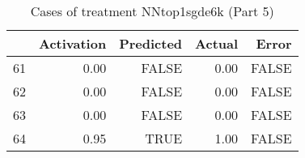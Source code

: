 \begin{table}[ht]
\centering
\begin{tabular}{rrrrr}
  \hline
 & Activation & Predicted & Actual & Error \\ 
  \hline
61 & 0.00 & FALSE & 0.00 & FALSE \\ 
  62 & 0.00 & FALSE & 0.00 & FALSE \\ 
  63 & 0.00 & FALSE & 0.00 & FALSE \\ 
  64 & 0.95 & TRUE & 1.00 & FALSE \\ 
   \hline
\end{tabular}
\caption{Cases of treatment NNtop1sgde6k (Part 5)} 
\end{table}
